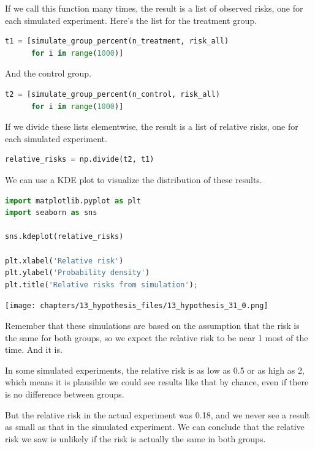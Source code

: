If we call this function many times, the result is a list of observed
risks, one for each simulated experiment. Here's the list for the
treatment group.

\begin{lstlisting}[language=Python,style=source]
t1 = [simulate_group_percent(n_treatment, risk_all)
      for i in range(1000)]
\end{lstlisting}

And the control group.

\begin{lstlisting}[language=Python,style=source]
t2 = [simulate_group_percent(n_control, risk_all)
      for i in range(1000)]
\end{lstlisting}

If we divide these lists elementwise, the result is a list of relative
risks, one for each simulated experiment.

\begin{lstlisting}[language=Python,style=source]
relative_risks = np.divide(t2, t1)
\end{lstlisting}

We can use a KDE plot to visualize the distribution of these results.

\begin{lstlisting}[language=Python,style=source]
import matplotlib.pyplot as plt
import seaborn as sns

sns.kdeplot(relative_risks)

plt.xlabel('Relative risk')
plt.ylabel('Probability density')
plt.title('Relative risks from simulation');
\end{lstlisting}

\begin{center}
\texttt{[image: chapters/13\_hypothesis\_files/13\_hypothesis\_31\_0.png]}
\end{center}

Remember that these simulations are based on the assumption that the
risk is the same for both groups, so we expect the relative risk to be
near 1 most of the time. And it is.

In some simulated experiments, the relative risk is as low as 0.5 or as
high as 2, which means it is plausible we could see results like that by
chance, even if there is no difference between groups.

But the relative risk in the actual experiment was 0.18, and we never
see a result as small as that in the simulated experiment. We can
conclude that the relative risk we saw is unlikely if the risk is
actually the same in both groups.

